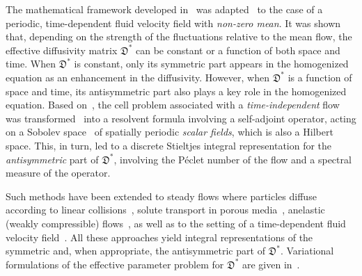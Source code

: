 \documentclass[english,12pt,jmp,graphicx]{revtex4-1}
\newcommand{\Dg}{\mathfrak{D}}
\begin{document}
The mathematical framework developed in~\cite{McLaughlin:SIAM_JAM:780}
was adapted~\cite{Pavliotis:PHD_Thesis,Majda:Kramer:1999:book} to the
case of a periodic, time-dependent 
fluid velocity field with \emph{non-zero mean}. It was
shown~\cite{Pavliotis:PHD_Thesis} that, depending 
on the strength of the fluctuations relative to the mean flow, the
effective diffusivity matrix $\Dg^*$ can be constant or a function of
both space and time. When $\Dg^*$ is constant, only its symmetric part
appears in the homogenized equation as an enhancement in the
diffusivity. However, when $\Dg^*$ is a function of space and time,
its antisymmetric part also plays a key role in the homogenized
equation. Based on~\cite{Bhattacharya:AAP:1999:951,Bhattacharya:1989:ASD}, the cell problem
associated with a \emph{time-independent} flow was
transformed~\cite{Pavliotis:PHD_Thesis} into a resolvent formula 
involving a self-adjoint operator, acting on a Sobolev
space~\cite{McOwen:2003:PDE,Folland:95:PDEs} of spatially periodic
\emph{scalar fields}, which is also a Hilbert space. This, in turn,
led to a discrete Stieltjes integral representation for the
\emph{antisymmetric} part of $\Dg^*$, involving the P{\'e}clet number
of the flow and a spectral measure of the operator.     



Such methods have been extended to steady flows where particles
diffuse according to linear collisions~\cite{Pavliotis:IMAJAM:951},
solute transport in porous media~\cite{Bhattacharya:AAP:1999:951,Bhattacharya:1989:ASD},
anelastic (weakly compressible)
flows~\cite{McLaughlin:Forest:PF:1999:880}, as well as to the
setting of a time-dependent fluid velocity
field~\cite{Murphy:ADSTPF-2017,Avellaneda:PRE:3249,Majda:Kramer:1999:book}. All
these approaches yield integral 
representations of the symmetric and, when appropriate, the
antisymmetric part of $\Dg^*$. Variational formulations of
the effective parameter problem for $\Dg^*$ are given
in~\cite{Fannjiang:1994:SIAM_JAM:333,Fannjiang:1997:1033,Avellaneda:CMP-339}. 
\end{document}
